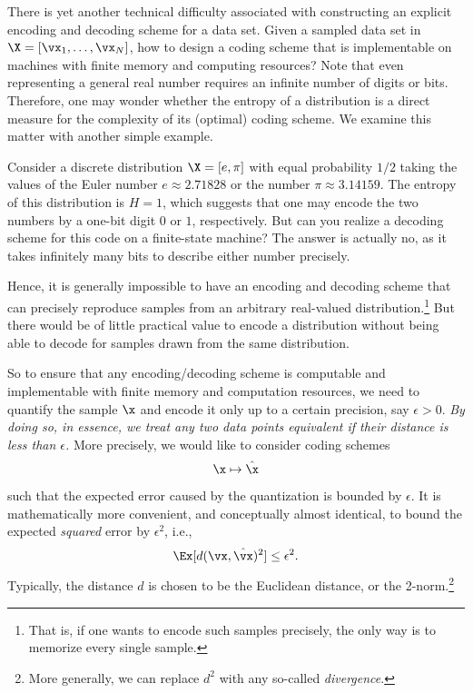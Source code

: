 \documentclass[../../book-main.tex]{subfiles}
\begin{document}
There is yet another technical difficulty associated with constructing an explicit encoding and decoding scheme for a data set. Given a sampled data set in $\X = [\vx_1, \ldots, \vx_N]$, how to design a coding scheme that is implementable on machines with finite memory and computing resources? Note that even representing a general real number requires an infinite number of digits or bits. Therefore, one may wonder whether the entropy of a distribution is a direct measure for the complexity of its (optimal) coding scheme. We examine this matter with another simple example.
\begin{example}[Precision] \label{eg:two-inrational}
	Consider a discrete distribution $\X = [e, \pi]$ with equal probability $1/2$ taking the values of the Euler number $e \approx 2.71828$ or the number $\pi \approx 3.14159$. The entropy of this distribution is $H =1$, which suggests that one may encode the two numbers by a one-bit digit $0$ or $1$, respectively. But can you realize a decoding scheme for this code on a finite-state machine? The answer is actually no, as it takes infinitely many bits to describe either number precisely.
\end{example}

Hence, it is generally impossible to have an encoding and decoding scheme that can precisely reproduce samples from an arbitrary real-valued distribution.\footnote{That is, if one wants to encode such samples precisely, the only way is to memorize every single sample. } But there would be of little practical value to encode a distribution without being able to decode for samples drawn from the same distribution.

So to ensure that any encoding/decoding scheme is computable and implementable with finite memory and computation resources, we need to quantify the sample $\x$ and encode it only up to a certain precision, say $\epsilon > 0$. {\em By doing so, in essence, we treat any two data points equivalent if their distance is less than $\epsilon$.} More precisely, we would like to consider coding schemes
\begin{equation}
	\x \mapsto \hat \x
\end{equation}
such that the expected error caused by the quantization is bounded by $\epsilon$. It is mathematically more convenient, and conceptually almost identical, to bound the expected \textit{squared} error by \(\epsilon^{2}\), i.e., 
\begin{equation}
	\Ex[d(\vx, \hat \vx)^{2}] \le \epsilon^{2}.
\end{equation}
Typically, the distance \(d\) is chosen to be the Euclidean distance, or the 2-norm.\footnote{More generally, we can replace \(d^{2}\) with any so-called \textit{divergence}.}
\end{document}
